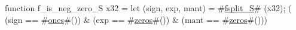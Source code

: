 function f_is_neg_zero_S   x32 = {
  let (sign, exp, mant) = #\hyperref[sailRISCVzfsplitzyS]{fsplit\_S}# (x32);
  (  (sign == #\hyperref[sailRISCVzones]{ones}#())
   & (exp  == #\hyperref[sailRISCVzzzeros]{zeros}#())
   & (mant == #\hyperref[sailRISCVzzzeros]{zeros}#()))
}
